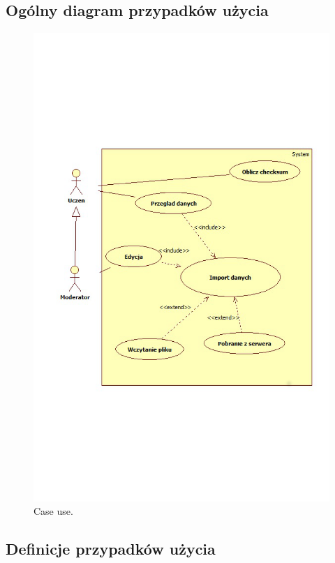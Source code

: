 \subsection{Ogólny diagram przypadków użycia}
\label{sec:diagramcaseuse}


\begin{center}
\begin{figure}[H]
\centering
     \includegraphics[origin=c,width=130mm]{ge/caseuse.jpg}
      \caption{Case use.}
       \label{fig:caseuse}
\end{figure}
\end{center}

\subsection{Definicje przypadków użycia}
\label{sec:defCaseuse}

